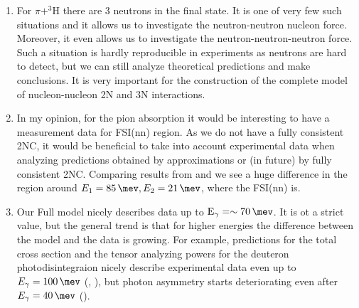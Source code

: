 \begin{enumerate}
    \item For $\pi + ^3$H there are 3 neutrons in the final state. It is one of very few such situations and it allows us to investigate the neutron-neutron nucleon force. Moreover, it even allows us to investigate the neutron-neutron-neutron force. Such a situation is hardly reproducible in experiments as neutrons are hard to detect, but we can still analyze theoretical predictions and make conclusions. It is very important for the construction of the complete model of nucleon-nucleon 2N and 3N interactions.
    \item In my opinion, for the pion absorption it would be interesting to have a measurement data for FSI(nn) region. As we do not have a fully consistent 2NC, it would be beneficial to take into account experimental data when analyzing predictions obtained by approximations or (in future) by fully consistent 2NC. Comparing results from   and  we see a huge difference in the region around $E_1=\SI{85}{\mev}, E_2 = \SI{21}{\mev}$, where the FSI(nn) is.
    \item Our Full model nicely describes data up to $\text{E}_\gamma = \sim\SI{70}{\mev}$. It is ot a strict value, but the general trend is that for higher energies the difference between the model and the data is growing. For example, predictions for the total cross section and the tensor analyzing powers for the deuteron photodisintegraion nicely describe experimental data even up to $E_\gamma = \SI{100}{\mev}$ (, ), but photon asymmetry starts deteriorating even after $E_\gamma = \SI{40}{\mev}$ ().
\end{enumerate}